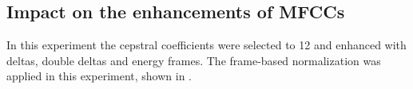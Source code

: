 
\subsection{Impact on the enhancements of MFCCs}\label{sec:exp_fs_mfcc}
In this experiment the cepstral coefficients were selected to 12 and enhanced with deltas, double deltas and energy frames.
The frame-based normalization was applied in this experiment, shown in .
